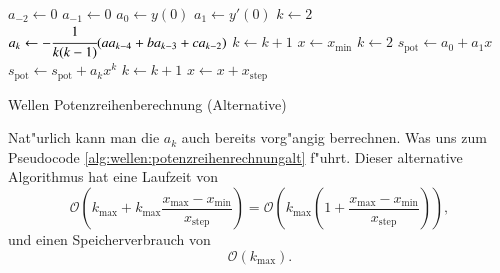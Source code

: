 \begin{algorithm}
	\begin{algorithmic}[1]
		\State $a_{-2} \gets 0$
		\State $a_{-1} \gets 0$
		\State $a_0 \gets y(0)$
		\State $a_1 \gets y'(0)$
		\State $k \gets 2$
		\State $a_k \gets -\cfrac{1}{k(k-1)} (aa_{k-4}+ba_{k-3}+ca_{k-2})$
		\State $k \gets k + 1$
		\EndFor
		\State $x \gets x_{\text{min}}$
		\State $k \gets 2$
		\State $s_{\text{pot}} \gets a_0 + a_1x$
		\State $s_{\text{pot}} \gets s_{\text{pot}} + a_k x^k$
		\State $k \gets k + 1$
		\EndFor
		\State $x \gets x + x_{\text{step}}$
		\EndFor
	\end{algorithmic}
	\caption{Wellen Potenzreihenberechnung (Alternative)}
	\label{alg:wellen:potenzreihenrechnungalt}
\end{algorithm}

Nat"urlich kann man die $a_k$ auch bereits vorg"angig berrechnen. Was uns zum 
Pseudocode \ref{alg:wellen:potenzreihenrechnungalt} f"uhrt. Dieser 
alternative Algorithmus hat eine Laufzeit von
\begin{equation*}
	\mathcal{O}
	\left(k_{\text{max}} + 
		k_{\text{max}}\frac{x_{\text{max}}-x_{\text{min}}}{x_{\text{step}}}
	\right)
	=
	\mathcal{O}
	\left(
		k_{\text{max}}
		\left(
			1+\frac{x_{\text{max}}-x_{\text{min}}}{x_{\text{step}}}
		\right)
	\right),
\end{equation*}
und einen Speicherverbrauch von
\begin{equation*}
	\mathcal{O}
	\left(
		k_{\text{max}}
	\right).
\end{equation*}
